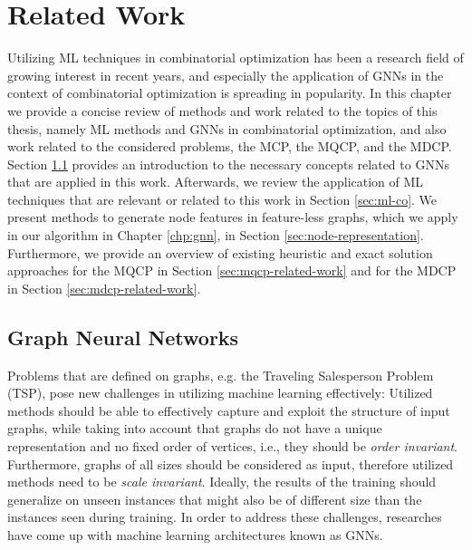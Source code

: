 \documentclass[draft,final]{vutinfth} %
\newtheorem{definition}{Definition}[section]
\begin{document}




\chapter{Related Work}\label{chp:related-work}

Utilizing ML techniques in combinatorial optimization has been a research field of growing interest in recent years, and especially the application of GNNs in the context of combinatorial optimization is spreading in popularity. 
In this chapter we provide a concise review of methods and work related to the topics of this thesis, namely ML methods and GNNs in combinatorial optimization, and also work related to the considered problems, the MCP, the MQCP, and the MDCP. Section \ref{sec:gnns} provides an introduction to the necessary concepts related to GNNs that are applied in this work. Afterwards, we review the application of ML techniques that are relevant or related to this work in Section \ref{sec:ml-co}. We present methods to generate node features in feature-less graphs, which we apply in our algorithm in Chapter \ref{chp:gnn}, in Section \ref{sec:node-representation}. Furthermore, we provide an overview of existing heuristic and exact solution approaches for the MQCP in Section \ref{sec:mqcp-related-work} and for the MDCP in Section \ref{sec:mdcp-related-work}. 

\section{Graph Neural Networks}\label{sec:gnns}
Problems that are defined on graphs, e.g. the Traveling Salesperson Problem (TSP), pose new challenges in utilizing machine learning effectively: Utilized methods should be able to effectively capture and exploit the structure of input graphs, while taking into account that graphs do not have a unique representation and no fixed order of vertices, i.e., they should be \emph{order invariant}. Furthermore, graphs of all sizes should be considered as input, therefore utilized methods need to be \emph{scale invariant}. Ideally, the results of the training should generalize on unseen instances that might also be of different size than the instances seen during training. In order to address these challenges, researches have come up with machine learning architectures known as GNNs. 
\end{document}
